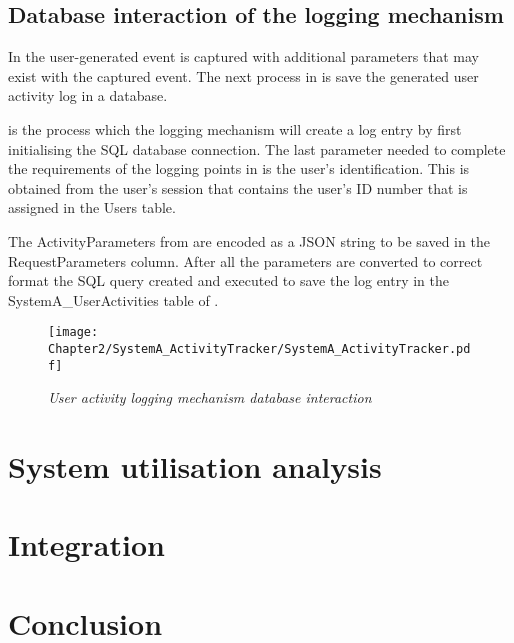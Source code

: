 \clearpage

\subsection{Database interaction of the logging mechanism}\label{sec:ch2_databaseInteraction}

In  the user-generated event is captured with additional parameters that may exist with the captured event. The next process in  is save the generated user activity log in a database.\par {} is the process which the logging mechanism will create a log entry by first initialising the SQL database connection. The last parameter needed to complete the requirements of the logging points in  is the user's identification. This is obtained from the user's session that contains the user's ID number that is assigned in the Users table.\par The ActivityParameters from   are encoded as a JSON string to be saved in the RequestParameters column. After all the parameters are converted to correct format the SQL query created and executed to save the log entry in the SystemA\_UserActivities table of .

\begin{figure}[!htb] %
	\centering %
	\texttt{[image: Chapter2/SystemA\_ActivityTracker/SystemA\_ActivityTracker.pdf]}
	\caption[User activity logging mechanism database interaction]
	{\textit{User activity logging mechanism database interaction}}\label{fig:ch2_databaseInteraction}
\end{figure}

\section{System utilisation analysis}\label{ch2:system_utilisation_analysis}

\section{Integration}

\section{Conclusion}